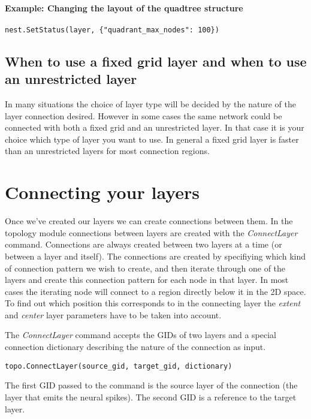 \documentclass{article}
\begin{document}
\paragraph{Example: Changing the layout of the quadtree structure}

\begin{verbatim}
nest.SetStatus(layer, {"quadrant_max_nodes": 100})
\end{verbatim}

\subsection{When to use a fixed grid layer and when to use an unrestricted layer}

In many situations the choice of layer type will be decided by the nature of the layer connection desired. However in some cases the same network could be connected with both a fixed grid and an unrestricted layer. In that case it is your choice which type of layer you want to use. In general a fixed grid layer is faster than an unrestricted layers for most connection regions.

\section{Connecting your layers}

Once we've created our layers we can create connections between them. In the topology module connections between layers are created with the \emph{ConnectLayer} command. Connections are always created between two layers at a time (or between a layer and itself). The connections are created by specifiying which kind of connection pattern we wish to create, and then iterate through one of the layers and create this connection pattern for each node in that layer. In most cases the iterating node will connect to a region directly below it in the 2D space. To find out which position this corresponds to in the connecting layer the \emph{extent} and \emph{center} layer parameters have to be taken into account.

The \emph{ConnectLayer} command accepts the GIDs of two layers and a special connection dictionary describing the nature of the connection as input.

\begin{verbatim}
topo.ConnectLayer(source_gid, target_gid, dictionary)
\end{verbatim}

The first GID passed to the command is the source layer of the connection (the layer that emits the neural spikes). The second GID is a reference to the target layer.
\end{document}
